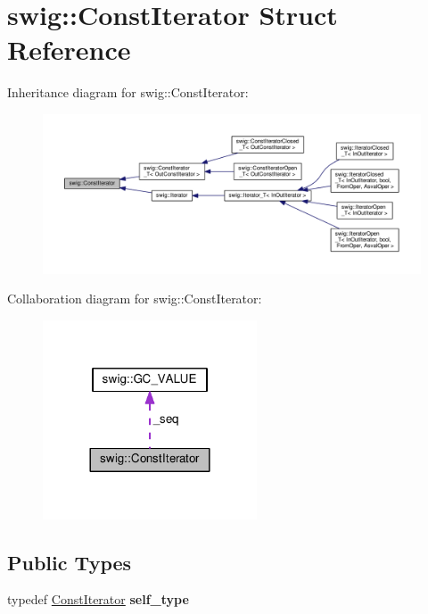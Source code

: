 \hypertarget{structswig_1_1ConstIterator}{}\section{swig\+:\+:Const\+Iterator Struct Reference}
\label{structswig_1_1ConstIterator}


Inheritance diagram for swig\+:\+:Const\+Iterator\+:
\nopagebreak
\begin{figure}[H]
\begin{center}
\leavevmode
\includegraphics[width=350pt]{structswig_1_1ConstIterator__inherit__graph}
\end{center}
\end{figure}


Collaboration diagram for swig\+:\+:Const\+Iterator\+:
\nopagebreak
\begin{figure}[H]
\begin{center}
\leavevmode
\includegraphics[width=180pt]{structswig_1_1ConstIterator__coll__graph}
\end{center}
\end{figure}
\subsection*{Public Types}
\begin{DoxyCompactItemize}
\item 
typedef \hyperlink{structswig_1_1ConstIterator}{Const\+Iterator} {\bfseries self\+\_\+type}\hypertarget{structswig_1_1ConstIterator_a8481b453850ae020eaad94e0b88a21de}{}\label{structswig_1_1ConstIterator_a8481b453850ae020eaad94e0b88a21de}

\end{DoxyCompactItemize}
